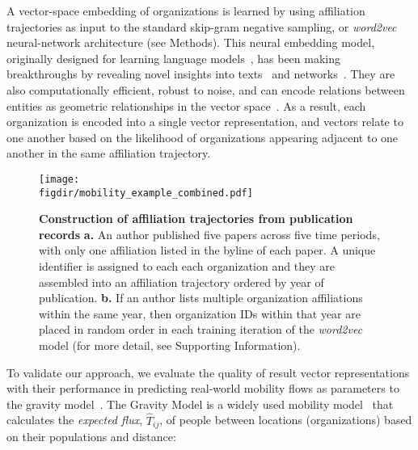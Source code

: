 \documentclass[12pt]{article} %
\def\figdir{../Figs}
\def\SI{Supporting Information}
\begin{document}
A vector-space embedding of organizations is learned by using affiliation trajectories as input to the standard skip-gram negative sampling, or \textit{word2vec} neural-network architecture (see Methods).
This neural embedding model, originally designed for learning language models~\autocite{mikolov2013word2vec}, has been making breakthroughs by revealing novel insights into texts~\autocite{linzhuo2020hyperbolic, tshitoyan2019mat2vec, garg2018gender, kozlowski2018geometry, hamilton2016diachronic, le2014doc2vec, nakandala2017gendered} and networks~\autocite{perozzi2014deepwalk, grover2016node2vec}.
They are also computationally efficient, robust to noise, and can encode relations between entities as geometric relationships in the vector space~\autocite{levy2014neural, nakandala2017gendered, kozlowski2018geometry, an2018semaxis}.
As a result, each organization is encoded into a single vector representation, and vectors relate to one another based on the likelihood of organizations appearing adjacent to one another in the same affiliation trajectory.

%
%
\begin{figure}[ht!]
    \centering
    \texttt{[image: \\figdir/mobility\_example\_combined.pdf]}
    \caption{
        \textbf{Construction of affiliation trajectories from publication records}
        \textbf{a.}
        An author published five papers across five time periods, with only one affiliation listed in the byline of each paper.
        A unique identifier is assigned to each each organization and they are assembled into an affiliation trajectory ordered by year of publication.
        \textbf{b.}
        If an author lists multiple organization affiliations within the same year, then organization IDs within that year are placed in random order in each training iteration of the \textit{word2vec} model (for more detail, see \SI).
    }
    \label{fig:methods:mobility_sentence}
\end{figure}

To validate our approach, we evaluate the quality of result vector representations with their performance in predicting real-world mobility flows as parameters to the gravity model~\autocite{zipf1946gravity, barbosa2018human}.
The Gravity Model is a widely used mobility model~\autocite{curiel2018citygravity, lewer2008immigrationgravity, jung2008highwaygravity, hong2016busgravity, truscott2012epidemicgravity, xia2005measlesgravity} that calculates the \textit{expected flux}, $\hat{T}_{ij}$, of people between locations (organizations) based on their populations and distance:
\end{document}
